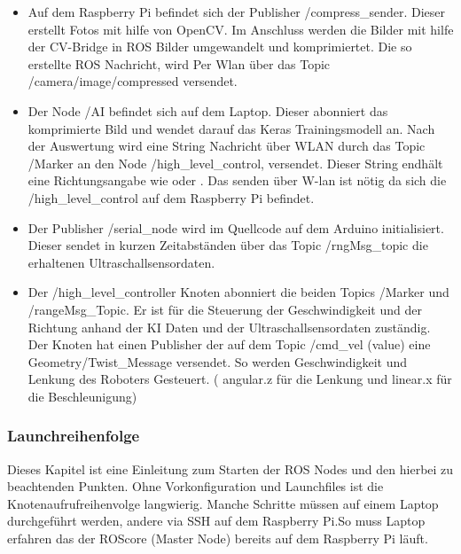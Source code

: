 \documentclass[conference]{IEEEtran}
\begin{document}
	\begin{itemize}
		\item Auf dem Raspberry Pi befindet sich der Publisher 
		/compress\_sender. Dieser erstellt Fotos mit hilfe von OpenCV. Im 
		Anschluss werden die Bilder mit hilfe der CV-Bridge in ROS Bilder 
		umgewandelt und komprimiertet. Die so erstellte ROS Nachricht, wird 
		Per Wlan über das Topic /camera/image/compressed versendet.
		
		\item Der Node /AI befindet sich auf dem Laptop. Dieser abonniert das 
		komprimierte Bild und wendet darauf das Keras Trainingsmodell an. 
		Nach der Auswertung wird eine String Nachricht über WLAN durch 
		das  Topic /Marker an den Node /high\_level\_control,  versendet. 
		Dieser String endhält eine Richtungsangabe wie  oder 
		. Das senden über W-lan ist nötig da sich die  
		/high\_level\_control auf dem Raspberry Pi befindet.
		
		\item Der Publisher /serial\_node wird im Quellcode auf dem Arduino initialisiert. Dieser sendet in kurzen Zeitabständen über das Topic /rngMsg\_topic die erhaltenen Ultraschallsensordaten.
		
		\item Der /high\_level\_controller Knoten abonniert die beiden Topics 
		/Marker und /rangeMsg\_Topic. Er ist für die Steuerung der 
		Geschwindigkeit und der Richtung anhand der KI Daten und der 
		Ultraschallsensordaten zuständig. Der Knoten hat einen Publisher der 
		auf dem  Topic /cmd\_vel (value) eine Geometry/Twist\_Message 
		versendet. So werden Geschwindigkeit und Lenkung des Roboters 
		Gesteuert. ( angular.z für die Lenkung und linear.x für die 
		Beschleunigung)
		
		
	\end{itemize}

	\subsubsection{Launchreihenfolge}%
	
	Dieses Kapitel ist eine Einleitung zum Starten der ROS Nodes und den 
	hierbei zu beachtenden Punkten. Ohne Vorkonfiguration und Launchfiles ist 
	die Knotenaufrufreihenvolge langwierig. Manche Schritte müssen auf einem 
	Laptop durchgeführt werden, andere via SSH auf dem Raspberry Pi.So muss 
	Laptop erfahren das der ROScore (Master Node) bereits auf dem Raspberry 
	Pi läuft.
	
\end{document}
